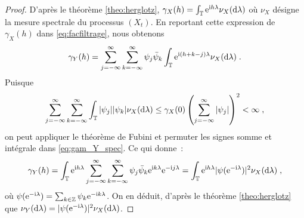 \begin{proof}
D'apr\`es le th\'eor\`eme \ref{theo:herglotz},
$\gamma_X(h)=\int_{\mathbb{T}}
\mathrm{e}^{\mathrm{i} h \lambda}\nu_X(\mathrm{d}\lambda)$ o\`u $\nu_X$ d\'esigne la mesure
spectrale du processus $(X_{t})$.
En reportant cette expression de $\gamma_X(h)$ dans
\eqref{eq:facfiltrage}, nous obtenons
\begin{equation}\label{eq:gam_Y_spec}
 \gamma_Y(h)= \sum_{j=-\infty}^\infty \sum_{k=-\infty}^\infty
          \psi_j \bar{\psi}_k \int_{\mathbb{T}} \mathrm{e}^{\mathrm{i} (h+k-j)\lambda} \nu_X(\mathrm{d}\lambda)\;.
\end{equation}
Puisque
\[
\sum_{j=-\infty}^\infty \sum_{k=-\infty}^\infty
  \int_{\mathbb{T}} |\psi_j| |\psi_k| \nu_X(\mathrm{d}\lambda)
  \leq \gamma_X(0) \left( \sum_{j=-\infty}^\infty |\psi_j| \right)^2<\infty\;,
\]
on peut appliquer le th\'eor\`eme de Fubini et permuter les
signes somme et int\'egrale dans \eqref{eq:gam_Y_spec}. Ce
qui donne~:
\[
\gamma_Y(h)
   = \int_{\mathbb{T}} \mathrm{e}^{\mathrm{i} h \lambda} \sum_{j=-\infty}^\infty \sum_{k=-\infty}^\infty
            \psi_j \bar{\psi}_k \mathrm{e}^{\mathrm{i} k \lambda}\mathrm{e}^{-\mathrm{i} j\lambda}
   = \int_{\mathbb{T}} \mathrm{e}^{\mathrm{i} h \lambda} |\psi(\mathrm{e}^{-\mathrm{i} \lambda})|^2 \nu_X(\mathrm{d}\lambda)\;,
\]
o\`u $\psi(\mathrm{e}^{-\mathrm{i} \lambda})=\sum_{k\in\mathbb{Z}} \psi_k \mathrm{e}^{-\mathrm{i} k \lambda}$.
On en d\'eduit, d'apr\`es le th\'eor\`eme \ref{theo:herglotz}
que $\nu_Y(\mathrm{d}\lambda) = |\psi(\mathrm{e}^{-\mathrm{i} \lambda})|^2\nu_X(\mathrm{d}\lambda)$.

\end{proof}





